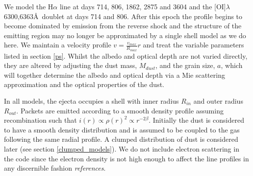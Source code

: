 \documentclass[useAMS,usenatbib,usegraphicx]{mnras}
\begin{document}
We model the H$\alpha$ line at days 714, 806, 1862, 2875 and 3604 and the [OI]$\lambda$6300,6363\AA\ doublet at days 714 and 806.  After this epoch the profile begins to become dominated by emission from the reverse shock and the structure of the emitting region may no longer be approximated by a single shell model as we do here.  We maintain a velocity profile $v = \frac{v_{max}}{R_{max}}r$ and treat the variable parameters listed in section \ref{ps}.  Whilst the albedo and optical depth are not varied directly, they are altered by adjusting the dust mass, $M_{dust}$, and the grain size, $a$, which will together determine the albedo and optical depth via a Mie scattering approximation and the optical properties of the dust.  

In all models, the ejecta occupies a shell with inner radius $R_{in}$ and outer radius $R_{out}$.  Packets are emitted according to a smooth density profile assuming recombination such that $i(r) \propto \rho(r)^2 \propto r^{-2\beta}$.  Initially the dust is considered to have a smooth density distribution and is assumed to be coupled to the gas following the same radial profile.  A clumped distribution of dust is considered later (see section \ref{clumped_models}).  We do not include electron scattering in the code since the electron density is not high enough to affect the line profiles in any discernible fashion \textit{references}.
\end{document}
